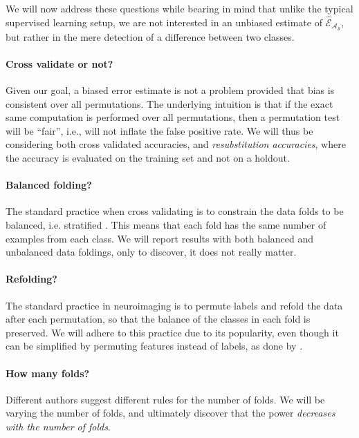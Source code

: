 \documentclass[12pt,a4paper]{article}
\theoremstyle{definition}
\newcommand{\accEstim}{\hat{\mathcal{E}}}
\newcommand{\hyp}{\algo_\data} %
\newcommand{\algo}{\mathcal{A}}
\newcommand{\data}{\mathcal{S}}
\begin{document}
We will now address these questions while bearing in mind that unlike the typical supervised learning setup, we are not interested in an unbiased estimate of $\accEstim_{\hyp}$, but rather in the mere detection of a difference between two classes. 

\paragraph{Cross validate or not?}
Given our goal, a biased error estimate is not a problem provided that bias is consistent over all permutations. 
The underlying intuition is that if the exact same computation is performed over all permutations, then a permutation test will be ``fair'', i.e., will not inflate the false positive rate. 
We will thus be considering both cross validated accuracies, and \emph{resubstitution accuracies}, where the accuracy is evaluated on the training set and not on a holdout.


\paragraph{Balanced folding?}
The standard practice when cross validating is to constrain the data folds to be balanced, i.e. stratified \citep[e.g.][]{ojala_permutation_2010}.
This means that each fold has the same number of examples from each class. 
We will report results with both balanced and unbalanced data foldings, only to discover, it does not really matter. 


\paragraph{Refolding?}
The standard practice in neuroimaging is to permute labels and refold the data after each permutation, so that the balance of the classes in each fold is preserved.
We will adhere to this practice due to its popularity, even though it can be simplified by permuting features instead of labels, as done by \citet{golland_permutation_2005}.


\paragraph{How many folds?}
Different authors suggest different rules for the number of folds. 
We will be varying the number of folds, and ultimately discover that the power \emph{decreases with the number of folds}. 
\end{document}

